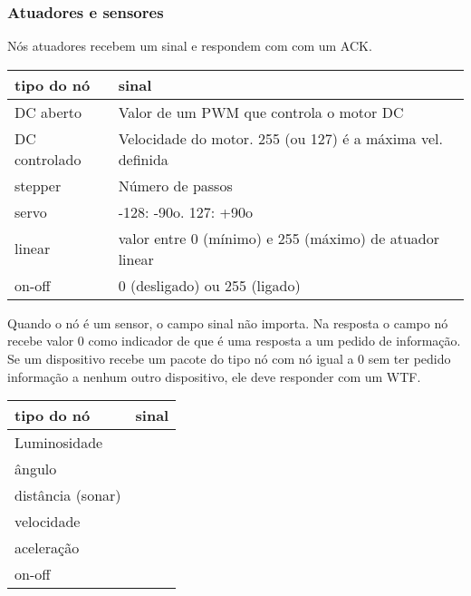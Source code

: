 \documentclass[11pt,	 papera4]{article}
\begin{document}
\subsubsection{Atuadores e sensores}
\label{sec-1.2.1}


Nós atuadores recebem um sinal e respondem com com um ACK.


\begin{center}
\begin{tabular}{ll}
\hline
 tipo do nó     &  sinal                                                       \\
\hline
 DC aberto      &  Valor de um PWM que controla o motor DC                     \\
 DC controlado  &  Velocidade do motor. 255 (ou 127) é a máxima vel. definida  \\
 stepper        &  Número de passos                                            \\
 servo          &  -128: -90o. 127: +90o                                       \\
 linear         &  valor entre 0 (mínimo) e 255 (máximo) de atuador linear     \\
 on-off         &  0 (desligado) ou 255 (ligado)                               \\
\hline
\end{tabular}
\end{center}



Quando o nó é um sensor, o campo sinal não importa. Na resposta o campo nó recebe valor 0 como indicador de que é uma resposta a um pedido de informação. Se um dispositivo recebe um pacote do tipo nó com nó igual a 0 sem ter pedido informação a nenhum outro dispositivo, ele deve responder com um WTF.


\begin{center}
\begin{tabular}{ll}
\hline
 tipo do nó         &  sinal  \\
\hline
 Luminosidade       &         \\
 ângulo             &         \\
 distância (sonar)  &         \\
 velocidade         &         \\
 aceleração         &         \\
 on-off             &         \\
\hline
\end{tabular}
\end{center}
\end{document}
